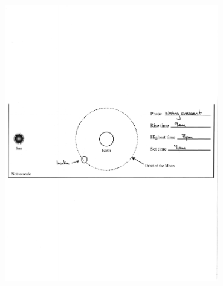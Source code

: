 \documentclass[11pt]{article}
\begin{document}
\includegraphics[width=0.7\textwidth]{moon_phase_sketch}

\newpage
\end{document}
